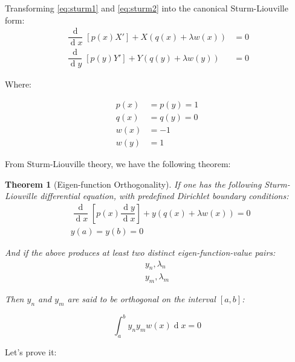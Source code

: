 \documentclass[12pt,a4paper]{report}
\DeclareMathOperator{\deriv}{d}
\theoremstyle{thms}
\newtheorem{theorem}{Theorem}[section]
\theoremstyle{defns}
\begin{document}
Transforming \eqref{eq:sturm1} and \eqref{eq:sturm2} into the canonical Sturm-Liouville form:
\begin{align}
    \dfrac{\deriv}{\deriv{x}}[p(x) X'] + X(q(x) + \lambda w(x)) & = 0 \\
    \dfrac{\deriv}{\deriv{y}}[p(y) Y'] + Y(q(y) + \lambda w(y)) & = 0
\end{align}

Where:

\begin{align}
    p(x) & = p(y) = 1 \\
    q(x) & = q(y) = 0 \\
    w(x) & = -1       \\
    w(y) & = 1
\end{align}

From Sturm-Liouville theory, we have the following theorem:

\begin{theorem}[Eigen-function Orthogonality]
    If one has the following Sturm-Liouville differential equation, with predefined Dirichlet boundary conditions:
    \begin{align}
         & \dfrac{\deriv}{\deriv{x}}[p(x) \dfrac{\deriv{y}}{\deriv{x}}] + y(q(x) + \lambda w(x)) = 0 \\
         & y(a) = y(b) = 0
    \end{align}

    And if the above produces at least two distinct eigen-function-value pairs:
    \begin{align}
        y_n, \lambda_n \\
        y_m, \lambda_m
    \end{align}

    Then $y_n$ and $y_m$ are said to be orthogonal on the interval $[a, b]$:

    \begin{equation}
        \int_{a}^{b} y_ny_mw(x) \deriv{x} = 0
        \label{eq:ortho-strum}
    \end{equation}
    \label{thm:sturm_proof}
\end{theorem}

Let's prove it:
\end{document}
